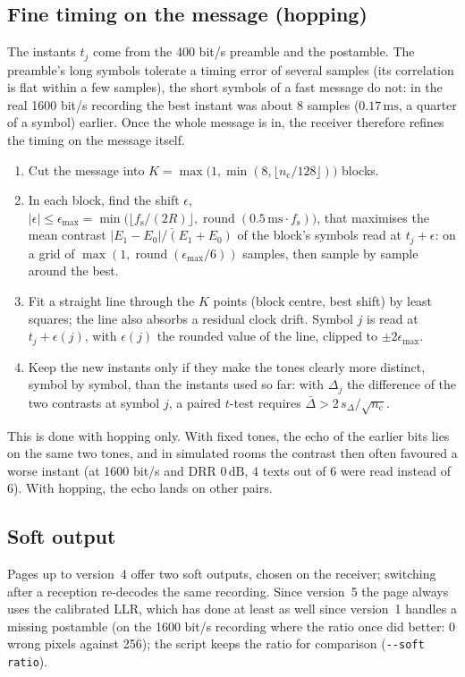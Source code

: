 \documentclass[11pt,a4paper]{article}
\newcommand{\ms}{\,\mathrm{ms}}
\newcommand{\dB}{\,\mathrm{dB}}
\newcommand{\round}[1]{\operatorname{round}\!\left(#1\right)}
\newcommand{\code}[1]{\texttt{#1}}
\newcommand{\fs}{f_{\mathrm{s}}}
\newcommand{\nc}{n_{\mathrm{c}}}
\theoremstyle{remark}
\begin{document}
\subsection{Fine timing on the message (hopping)}
\label{sec:finetiming}
The instants $t_j$ come from the 400 bit/s preamble and the postamble. The preamble's long symbols tolerate a timing error of several samples (its correlation is flat within a few samples), the short symbols of a fast message do not: in the real 1600 bit/s recording the best instant was about 8 samples ($0.17\ms$, a quarter of a symbol) earlier. Once the whole message is in, the receiver therefore refines the timing on the message itself.
\begin{enumerate}
\item Cut the message into $K = \max\bigl(1, \min(8, \lfloor \nc/128 \rfloor)\bigr)$ blocks.
\item In each block, find the shift $\epsilon$, $|\epsilon| \le \epsilon_{\max} = \min\bigl(\lfloor \fs/(2R) \rfloor, \round{0.5\ms \cdot \fs}\bigr)$, that maximises the mean contrast $\overline{|E_1 - E_0|/(E_1 + E_0)}$ of the block's symbols read at $t_j + \epsilon$: on a grid of $\max(1, \round{\epsilon_{\max}/6})$ samples, then sample by sample around the best.
\item Fit a straight line through the $K$ points (block centre, best shift) by least squares; the line also absorbs a residual clock drift. Symbol $j$ is read at $t_j + \epsilon(j)$, with $\epsilon(j)$ the rounded value of the line, clipped to $\pm 2\epsilon_{\max}$.
\item Keep the new instants only if they make the tones clearly more distinct, symbol by symbol, than the instants used so far: with $\Delta_j$ the difference of the two contrasts at symbol $j$, a paired $t$-test requires $\bar\Delta > 2\, s_\Delta / \sqrt{\nc}$.
\end{enumerate}
This is done with hopping only. With fixed tones, the echo of the earlier bits lies on the same two tones, and in simulated rooms the contrast then often favoured a worse instant (at 1600 bit/s and DRR $0\dB$, 4 texts out of 6 were read instead of 6). With hopping, the echo lands on other pairs.

\subsection{Soft output}
\label{sec:soft}
Pages up to version~4 offer two soft outputs, chosen on the receiver; switching after a reception re-decodes the same recording. Since version~5 the page always uses the calibrated LLR, which has done at least as well since version~1 handles a missing postamble (on the 1600 bit/s recording where the ratio once did better: 0 wrong pixels against 256); the script keeps the ratio for comparison (\code{-{}-soft ratio}).
\end{document}
